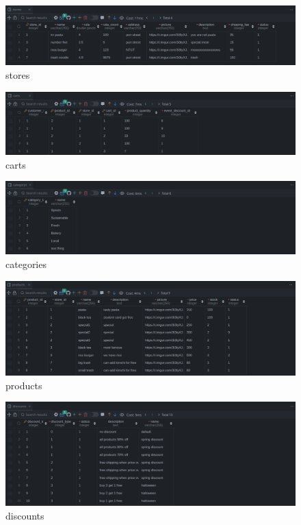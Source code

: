 \documentclass[a4paper, 12pt]{article}
\begin{document}
\begin{figure}[hp]
    \centerline{\includegraphics[width=\linewidth]{snapshot/stores.png}}
    \caption{stores}
\end{figure}

\begin{figure}[hp]
    \centerline{\includegraphics[width=\linewidth]{snapshot/carts.png}}
    \caption{carts}
\end{figure}

\begin{figure}[hp]
    \centerline{\includegraphics[width=\linewidth]{snapshot/categories.png}}
    \caption{categories}
\end{figure}

\begin{figure}[hp]
    \centerline{\includegraphics[width=\linewidth]{snapshot/products.png}}
    \caption{products}
\end{figure}

\begin{figure}[hp]
    \centerline{\includegraphics[width=\linewidth]{snapshot/discounts.png}}
    \caption{discounts}
\end{figure}
\end{document}

